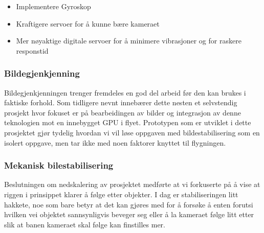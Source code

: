 \begin{itemize}

\item Implementere Gyroskop



\item Kraftigere servoer for å kunne bære kameraet



\item Mer nøyaktige digitale servoer for å minimere vibrasjoner og for raskere responstid

\end{itemize} 


\subsubsection{Bildegjenkjenning}
Bildegjenkjenningen trenger fremdeles en god del arbeid før den kan brukes i faktiske forhold. Som tidligere nevnt innebærer dette nesten et selvstendig prosjekt hvor fokuset er på bearbeidingen av bilder og integrasjon av denne teknologien mot en innebygget GPU i flyet. Prototypen som er utviklet i dette prosjektet gjør tydelig hvordan vi vil løse oppgaven med bildestabilisering som en isolert oppgave, men tar ikke med noen faktorer knyttet til flygningen.

\subsubsection{Mekanisk bilestabilisering}
Beslutningen om nedskalering av prosjektet medførte at vi forkuserte på å vise at riggen i prinsippet klarer å følge etter objekter. I dag er stabiliseringen litt hakkete, noe som bare betyr at det kan gjøres med for å forsøke å enten forutsi hvilken vei objektet sannsynligvis beveger seg eller å la kameraet følge litt etter slik at banen kameraet skal følge kan finstilles mer.



